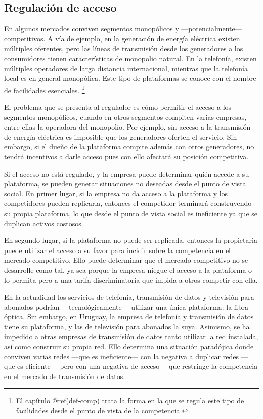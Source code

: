 \documentclass[
  12pt,
  spanish,
]{book}
\begin{document}
\hypertarget{regulaciuxf3n-de-acceso}{%
\subsection{Regulación de acceso}\label{regulaciuxf3n-de-acceso}}

En algunos mercados conviven segmentos monopólicos y
---potencialmente--- competitivos. A vía de ejemplo, en la generación de
energía eléctrica existen múltiples oferentes, pero las líneas de
transmisión desde los generadores a los consumidores tienen
características de monopolio natural. En la telefonía, existen múltiples
operadores de larga distancia internacional, mientras que la telefonía
local es en general monopólica. Este tipo de plataformas se conoce con
el nombre de facilidades esenciales. \footnote{El capítulo
  @ref(def-comp) trata la forma en la que se regula este tipo de
  facilidades desde el punto de vista de la competencia.}

El problema que se presenta al regulador es cómo permitir el acceso a
los segmentos monopólicos, cuando en otros segmentos compiten varias
empresas, entre ellas la operadora del monopolio. Por ejemplo, sin
acceso a la transmisión de energía eléctrica es imposible que los
generadores oferten el servicio. Sin embargo, si el dueño de la
plataforma compite además con otros generadores, no tendrá incentivos a
darle acceso pues con ello afectará su posición competitiva.

Si el acceso no está regulado, y la empresa puede determinar quién
accede a su plataforma, se pueden generar situaciones no deseadas desde
el punto de vista social. En primer lugar, si la empresa no da acceso a
la plataforma y los competidores pueden replicarla, entonces el
competidor terminará construyendo su propia plataforma, lo que desde el
punto de vista social es ineficiente ya que se duplican activos
costosos.

En segundo lugar, si la plataforma no puede ser replicada, entonces la
propietaria puede utilizar el acceso a su favor para incidir sobre la
competencia en el mercado competitivo. Ello puede determinar que el
mercado competitivo no se desarrolle como tal, ya sea porque la empresa
niegue el acceso a la plataforma o lo permita pero a una tarifa
discriminatoria que impida a otros competir con ella.

En la actualidad los servicios de telefonía, transmisión de datos y
televisión para abonados podrían ---tecnológicamente--- utilizar una
única plataforma: la fibra óptica. Sin embargo, en Uruguay, la empresa
de telefonía y transmisión de datos tiene su plataforma, y las de
televisión para abonados la suya. Asimismo, se ha impedido a otras
empresas de transmisión de datos tanto utilizar la red instalada, así
como construir su propia red. Ello determina una situación paradójica
donde conviven varias redes ---que es ineficiente--- con la negativa a
duplicar redes ---que es eficiente--- pero con una negativa de acceso
---que restringe la competencia en el mercado de transmisión de datos.
\end{document}
